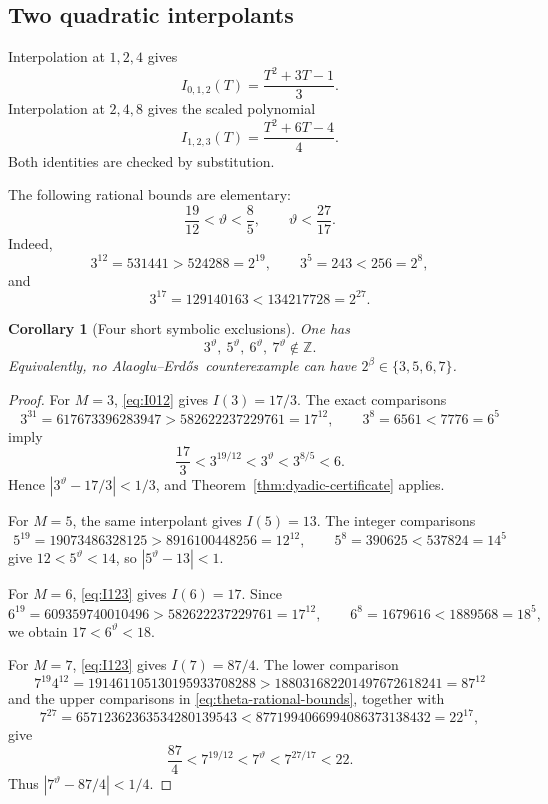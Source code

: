 \documentclass[11pt,oneside]{article}
\newtheorem{corollary}[theorem]{Corollary}
\theoremstyle{definition}
\theoremstyle{remark}
\newcommand{\Z}{\mathbb Z}
\newcommand{\AEname}{Alaoglu--Erd\H{o}s}
\newcommand{\thetaq}{\vartheta}
\begin{document}
\subsection{Two quadratic interpolants}

Interpolation at $1,2,4$ gives
\begin{equation}
 I_{0,1,2}(T)=\frac{T^2+3T-1}{3}.
 \label{eq:I012}
\end{equation}
Interpolation at $2,4,8$ gives the scaled polynomial
\begin{equation}
 I_{1,2,3}(T)=\frac{T^2+6T-4}{4}.
 \label{eq:I123}
\end{equation}
Both identities are checked by substitution.

The following rational bounds are elementary:
\begin{equation}
 \frac{19}{12}<\thetaq<\frac85,
 \qquad
 \thetaq<\frac{27}{17}.
 \label{eq:theta-rational-bounds}
\end{equation}
Indeed,
\[
 3^{12}=531441>524288=2^{19},
 \qquad
 3^5=243<256=2^8,
\]
and
\[
 3^{17}=129140163<134217728=2^{27}.
\]

\begin{corollary}[Four short symbolic exclusions]
\label{cor:small-M}
One has
\[
 3^{\thetaq},\ 5^{\thetaq},\ 6^{\thetaq},\ 7^{\thetaq}\notin\Z.
\]
Equivalently, no \AEname\ counterexample can have
$2^\beta\in\{3,5,6,7\}$.
\end{corollary}

\begin{proof}
For $M=3$, \eqref{eq:I012} gives $I(3)=17/3$.  The exact comparisons
\[
 3^{31}=617673396283947>582622237229761=17^{12},
 \qquad
 3^8=6561<7776=6^5
\]
imply
\[
 \frac{17}{3}<3^{19/12}<3^{\thetaq}<3^{8/5}<6.
\]
Hence $|3^{\thetaq}-17/3|<1/3$, and
Theorem~\ref{thm:dyadic-certificate} applies.

For $M=5$, the same interpolant gives $I(5)=13$.  The integer comparisons
\[
 5^{19}=19073486328125>8916100448256=12^{12},
 \qquad
 5^8=390625<537824=14^5
\]
give $12<5^{\thetaq}<14$, so $|5^{\thetaq}-13|<1$.

For $M=6$, \eqref{eq:I123} gives $I(6)=17$.  Since
\[
 6^{19}=609359740010496>582622237229761=17^{12},
 \qquad
 6^8=1679616<1889568=18^5,
\]
we obtain $17<6^{\thetaq}<18$.

For $M=7$, \eqref{eq:I123} gives $I(7)=87/4$.  The lower comparison
\[
 7^{19}4^{12}=191461105130195933708288
 >188031682201497672618241=87^{12}
\]
and the upper comparisons in \eqref{eq:theta-rational-bounds}, together with
\[
 7^{27}=65712362363534280139543
 <8771994066994086373138432=22^{17},
\]
give
\[
 \frac{87}{4}<7^{19/12}<7^{\thetaq}<7^{27/17}<22.
\]
Thus $|7^{\thetaq}-87/4|<1/4$.
\end{proof}
\end{document}
